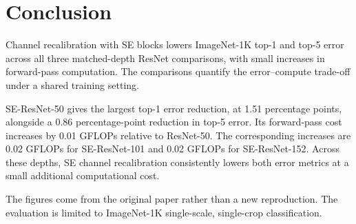 \section{Conclusion}

Channel recalibration with SE blocks lowers ImageNet-1K top-1 and top-5 error across all three matched-depth ResNet comparisons, with small increases in forward-pass computation. The comparisons quantify the error--compute trade-off under a shared training setting.

SE-ResNet-50 gives the largest top-1 error reduction, at 1.51 percentage points, alongside a 0.86 percentage-point reduction in top-5 error. Its forward-pass cost increases by 0.01 GFLOPs relative to ResNet-50. The corresponding increases are 0.02 GFLOPs for SE-ResNet-101 and 0.02 GFLOPs for SE-ResNet-152. Across these depths, SE channel recalibration consistently lowers both error metrics at a small additional computational cost.

The figures come from the original paper rather than a new reproduction. The evaluation is limited to ImageNet-1K single-scale, single-crop classification.
